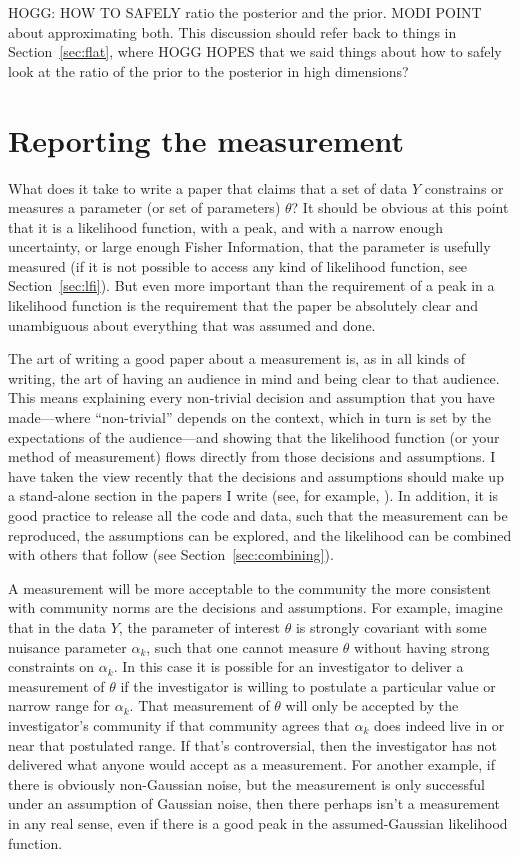 \documentclass{article}
\newcommand{\sectionname}{Section}
\newcommand{\secref}[1]{\sectionname~\ref{#1}}
\begin{document}
HOGG: HOW TO SAFELY ratio the posterior and the prior. MODI POINT about approximating both.
This discussion should refer back to things in \secref{sec:flat}, where HOGG HOPES that we said things about how to safely look at the ratio of the prior to the posterior in high dimensions?

\section{Reporting the measurement}\label{sec:reporting}
What does it take to write a paper that claims that a set of data $Y$ constrains or measures a parameter (or set of parameters) $\theta$?
It should be obvious at this point that it is a likelihood function, with a peak, and with a narrow enough uncertainty, or large enough Fisher Information, that the parameter is usefully measured
(if it is not possible to access any kind of likelihood function, see \secref{sec:lfi}).
But even more important than the requirement of a peak in a likelihood function is the requirement that the paper be absolutely clear and unambiguous about everything that was assumed and done.

The art of writing a good paper about a measurement is, as in all kinds of writing, the art of having an audience in mind and being clear to that audience.
This means explaining every non-trivial decision and assumption that you have made---where ``non-trivial'' depends on the context, which in turn is set by the expectations of the audience---and showing that the likelihood function (or your method of measurement) flows directly from those decisions and assumptions.
I have taken the view recently that the decisions and assumptions should make up a stand-alone section in the papers I write (see, for example, \cite{frizzle}).
In addition, it is good practice to release all the code and data, such that the measurement can be reproduced, the assumptions can be explored, and the likelihood can be combined with others that follow (see \secref{sec:combining}).

A measurement will be more acceptable to the community the more consistent with community norms are the decisions and assumptions.
For example, imagine that in the data $Y$, the parameter of interest $\theta$ is strongly covariant with some nuisance parameter $\alpha_k$,
such that one cannot measure $\theta$ without having strong constraints on $\alpha_k$.
In this case it is possible for an investigator to deliver a measurement of $\theta$ if the investigator is willing to postulate a particular value or narrow range for $\alpha_k$.
That measurement of $\theta$ will only be accepted by the investigator's community if that community agrees that $\alpha_k$ does indeed live in or near that postulated range.
If that's controversial, then the investigator has not delivered what anyone would accept as a measurement.
For another example, if there is obviously non-Gaussian noise, but the measurement is only successful under an assumption of Gaussian noise, then there perhaps isn't a measurement in any real sense, even if there is a good peak in the assumed-Gaussian likelihood function.
\end{document}

